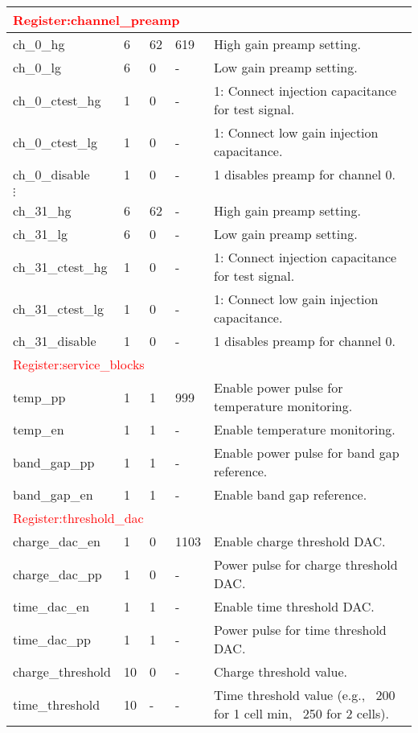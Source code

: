 \begin{longtable}{|p{6cm}|p{1cm}|p{1.4cm}|p{1.8cm}|p{5cm}|}
\multicolumn{5}{|l|}{\textcolor{red}{Register:channel\_preamp}} \\ \hline
ch\_0\_hg                  & 6  & 62 & 619 & High gain preamp setting. \\ \hline
ch\_0\_lg                  & 6  & 0  & -   & Low gain preamp setting. \\ \hline
ch\_0\_ctest\_hg            & 1  & 0  & -   & 1: Connect injection capacitance for test signal. \\ \hline
ch\_0\_ctest\_lg            & 1  & 0  & -   & 1: Connect low gain injection capacitance. \\ \hline
ch\_0\_disable             & 1  & 0  & -   & 1 disables preamp for channel 0. \\ \hline
$\vdots$ & &   &  & \\ \hline
ch\_31\_hg                  & 6  & 62 & - & High gain preamp setting. \\ \hline
ch\_31\_lg                  & 6  & 0  & -   & Low gain preamp setting. \\ \hline
ch\_31\_ctest\_hg            & 1  & 0  & -   & 1: Connect injection capacitance for test signal. \\ \hline
ch\_31\_ctest\_lg            & 1  & 0  & -   & 1: Connect low gain injection capacitance. \\ \hline
ch\_31\_disable             & 1  & 0  & -   & 1 disables preamp for channel 0. \\ \hline
\multicolumn{5}{|l|}{\textcolor{red}{Register:service\_blocks}} \\ \hline
temp\_pp                  & 1  & 1 & 999   & Enable power pulse for temperature monitoring. \\ \hline
temp\_en                  & 1  & 1 & -   & Enable temperature monitoring. \\ \hline
band\_gap\_pp              & 1  & 1 & -   & Enable power pulse for band gap reference. \\ \hline
band\_gap\_en              & 1  & 1 & -   & Enable band gap reference. \\ \hline

\multicolumn{5}{|l|}{\textcolor{red}{Register:threshold\_dac}} \\ \hline
charge\_dac\_en            & 1  & 0 & 1103 & Enable charge threshold DAC. \\ \hline
charge\_dac\_pp            & 1  & 0 & -   & Power pulse for charge threshold DAC. \\ \hline
time\_dac\_en              & 1  & 1 & -   & Enable time threshold DAC. \\ \hline
time\_dac\_pp              & 1  & 1 & -   & Power pulse for time threshold DAC. \\ \hline
charge\_threshold         & 10 & 0 & -   & Charge threshold value. \\ \hline
time\_threshold           & 10 & - & -   & Time threshold value (e.g., ~200 for 1 cell min, ~250 for 2 cells). \\ \hline


\end{longtable}
